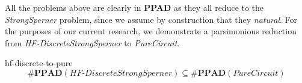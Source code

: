 

All the problems above are clearly in \textbf{PPAD} as they all reduce to the \textit{StrongSperner} problem,
since we assume by construction that they \textit{natural}. For the purposes of our current
research, we demonstrate a parsimonious reduction from \textit{HF-DiscreteStrongSperner} to \textit{PureCircuit}.


\begin{theorembox}{}{hf-discrete-to-pure}
    $$
        \textbf{\#PPAD}(\textit{HF-DiscreteStrongSperner}) \subseteq \textbf{\#PPAD}(\textit{PureCircuit})
    $$
\end{theorembox}

